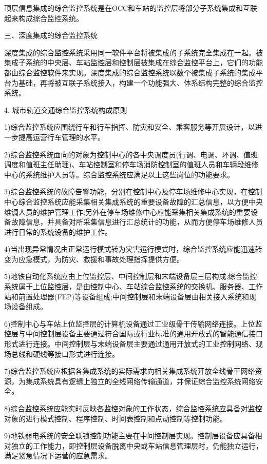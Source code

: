 顶层信息集成的综合监控系统是在OCC和车站的监控层将部分子系统集成和互联起来构成综合监控系统。

三、深度集成的综合监控系统

深度集成的综合监控系统采用同一软件平台将被集成的子系统完全集成在一起。被集成子系统的中央层、车站监控层和控制层被集成在综合监控平台上，它们的功能都由综合监控软件来实现。深度集成的综合监控系统以数个被集成子系统的集成平台为基础，再将被互联子系统接入，构建一个功能强大、体系结构完整的综合监控系统。

4. 城市轨道交通综合监控系统构成原则

1)综合监控系统应围绕行车和行车指挥、防灾和安全、乘客服务等开展设计，以进一步提高运营行车管理的水平。

2)综合监控系统面向的对象为控制中心的各中央调度员(行调、电调、环调、值班调度和值班主任助理)、车站控制室和停车场消防控制室的值班人员和车辆段维修中心的系统维护人员等。综合监控系统应满足以上这些岗位的功能要求。

3)综合监控系统的故障告警功能，分别在控制中心及停车场维修中心实现，在控制中心综合监控系统应能采集相关集成系统的重要设备故障的汇总信息，以方便中央维调人员的维护管理工作;另外在停车场维修中心应能采集相关集成系统的重要设备故障信息，并具备对所采集信息进行汇总统计的功能，从而方便停车场维修人员进行日常的系统设备的维护工作。

4)当出现异常情况由正常运行模式转为灾害运行模式时，综合监控系统应能迅速转变为应急模式，为防灾、救援和事故处理指挥提供方便。

5)地铁自动化系统应由上位监控层、中间控制层和末端设备层三层构成;综合监控系统属于上位监控层，是由控制中心、车站综合监控系统的交换机、服务器、工作站和前置处理器(FEP)等设备组成;中间控制层和末端设备层由相关接入系统和现场设备组成。

6)控制中心与车站上位监控层的计算机设备通过工业级骨干传输网络连接。上位监控层与中间控制层设备主要通过符合国际或行业标准的通用开放式的智能通信接口形式进行连接。中间控制层与末端设备层主要通过通用开放式的工业控制网络、现场总线和硬线等接口形式进行连接。

7)综合监控系统应根据各集成系统的实际需求向相关集成系统开放全线骨干网络资源，为集成系统具有逻辑上独立的全线网络传输通道，并保证综合监控系统网络安全。

8)综合监控系统应能实时反映各监控对象的工作状态，综合监控系统应具备对监控对象的进行模式控制、程序控制、时间表控制和点动控制等控制功能。

9)地铁弱电系统的安全联锁控制功能主要在中间控制层实现。控制层设备应具备相对独立的工作能力，即控制层设备脱离中央或车站信息管理层时，仍能独立运行，满足紧急情况下运营的应急需求。

